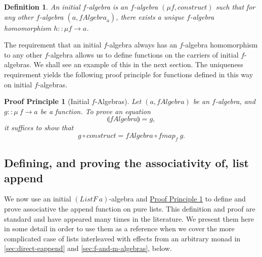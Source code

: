 \documentclass{jfp1}
\newcommand{\fold}[1]{\llparenthesis #1 \rrparenthesis}
\newtheorem{definition}{Definition}
\newtheorem{proofprinciple}{Proof Principle}
\newcommand{\proofprinref}[1]{\hyperref[#1]{Proof Principle \ref*{#1}}}
\begin{document}
\begin{definition}
  An \emph{initial} $f$-algebra is an $f$-algebra $(\mu f,
  \mathit{construct})$ such that for any other $f$-algebra $(a,
  \mathit{fAlgebra}_a)$, there exists a \emph{unique} $f$-algebra
  homomorphism $h :: \mu f \to a$.
\end{definition}

The requirement that an initial $f$-algebra always has an $f$-algebra
homomorphism to any other $f$-algebra allows us to define functions on
the carriers of initial $f$-algebras. We shall see an example of this
in the next section. The uniqueness requirement yields the following
proof principle for functions defined in this way on initial
$f$-algebras.

\begin{proofprinciple}[Initial $f$-Algebras]\label{pp:initial-alg}
  Let $(a, \mathit{fAlgebra})$ be an $f$-algebra, and $g :: \mu~f \to
  a$ be a function. To prove an equation
  \begin{displaymath}
    \fold{\mathit{fAlgebra}} = g,
  \end{displaymath}
  it suffices to show that
  \begin{displaymath}
    g \circ \mathit{construct} = \mathit{fAlgebra} \circ \mathit{fmap}_f~g.
  \end{displaymath}
\end{proofprinciple}

\subsection{Defining, and proving the associativity of, list append}
\label{sec:pure-append}

We now use an initial $(\mathit{ListF}~a)$-algebra and
\proofprinref{pp:initial-alg} to define and prove associative the
append function on pure lists. This definition and proof are standard
and have appeared many times in the literature. We present them here
in some detail in order to use them as a reference when we cover the
more complicated case of lists interleaved with effects from an
arbitrary monad in \autoref{sec:direct-eappend} and
\autoref{sec:f-and-m-algebras}, below.
\end{document}
